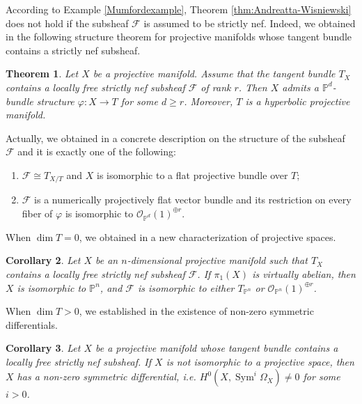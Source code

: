 \documentclass[english,reqno]{amsart}
\newcommand\bbP{{\mathbb P}}
\newcommand\sF{{\mathscr F}}
\newcommand\sO{{\mathscr O}}
\DeclareMathOperator*{\Sym}{Sym}
\theoremstyle{plain}
\newtheorem{thm}{Theorem}[section]
\newtheorem{cor}[thm]{Corollary}
\theoremstyle{definition}
\numberwithin{equation}{section} %
\begin{document}
\noindent  According to Example \ref{Mumfordexample},    Theorem \ref{thm:Andreatta-Wisniewski}
does not hold  if the subsheaf $\sF$ is  assumed to be strictly nef. Indeed, we  obtained in \cite[Theorem~1.3]{LiuOuYang2020} the following structure theorem for projective
manifolds whose tangent bundle contains a strictly nef subsheaf.

\begin{thm}
    \label{thm:main-theorem}
    Let $X$ be a  projective manifold. Assume that the tangent bundle $T_X$ contains a locally free strictly nef subsheaf $\sF$ of rank $r$.
    Then $X$ admits a $\bbP^d$-bundle structure $\varphi: X\rightarrow T$ for some $d\geq r$.
    Moreover,
    $T$ is a hyperbolic projective manifold.
\end{thm}


 \noindent  Actually,  we  obtained in \cite[Theorem~8.1]{LiuOuYang2020}  a  concrete description on the
 structure of the subsheaf $\sF$ and it is exactly one of the following:
 \begin{enumerate}
    \item $\sF\cong  T_{X/T}$ and $X$ is isomorphic to a flat projective bundle over
    $T$;
    \item $\sF$ is a numerically projectively flat vector bundle and its restriction  on every fiber of $\varphi$ is  isomorphic to  $\sO_{\bbP^d}(1)^{\oplus r}$.
 \end{enumerate}




 \noindent   When $\dim T=0$, we obtained in \cite[Theorem~1.4]{LiuOuYang2020} a new characterization of projective spaces.
\begin{cor}
    \label{simply-connected-Pn}  Let $X$ be an $n$-dimensional  projective manifold such that $T_X$ contains a locally free strictly nef subsheaf $\sF$.
    If $\pi_1(X)$ is virtually abelian, then $X$ is isomorphic to  $\bbP^n$, and $\sF$ is isomorphic to either $T_{\bbP^n}$ or $\sO_{\bbP^n}(1)^{\oplus r}$.
\end{cor}




\noindent  When $\dim T>0$, we established in \cite[Corollary~1.5]{LiuOuYang2020} the  existence of non-zero symmetric differentials.

\begin{cor}
    \label{cor:existence-symmetric-forms}
    Let $X$ be a projective manifold whose tangent bundle contains a  locally free strictly nef subsheaf. If $X$ is not isomorphic to a projective space, then $X$ has a non-zero symmetric differential, i.e. $H^0(X,\Sym^i\Omega_X)\not=0$ for some $i>0$.
\end{cor}






\def\cprime{$'$} %
\renewcommand\refname{Reference}


\end{document}
